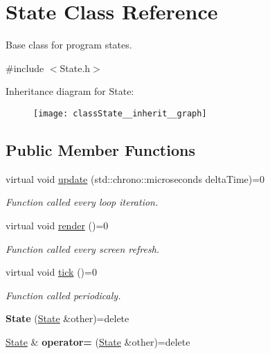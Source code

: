 \hypertarget{classState}{\section{State Class Reference}
\label{classState}
}


Base class for program states.  




{\ttfamily \#include $<$State.\-h$>$}



Inheritance diagram for State\-:
\nopagebreak
\begin{figure}[H]
\begin{center}
\leavevmode
\texttt{[image: classState\_\_inherit\_\_graph]}
\end{center}
\end{figure}
\subsection*{Public Member Functions}
\begin{DoxyCompactItemize}
\item 
virtual void \hyperlink{classState_af2121f8eb52144b7a789214f15e3601a}{update} (std\-::chrono\-::microseconds delta\-Time)=0
\begin{DoxyCompactList}\small\item\em Function called every loop iteration. \end{DoxyCompactList}\item 
virtual void \hyperlink{classState_a71f5105bcdc39481be7684d853fe12e9}{render} ()=0
\begin{DoxyCompactList}\small\item\em Function called every screen refresh. \end{DoxyCompactList}\item 
virtual void \hyperlink{classState_a1cdec36e9ffad91ba7af560770601017}{tick} ()=0
\begin{DoxyCompactList}\small\item\em Function called periodicaly. \end{DoxyCompactList}\item 
\hypertarget{classState_a8fba10b9995ce898339f3b0d39234788}{{\bfseries State} (\hyperlink{classState}{State} \&other)=delete}\label{classState_a8fba10b9995ce898339f3b0d39234788}

\item 
\hypertarget{classState_a7ac6cc4de6723746df3dfb183b8eb84f}{\hyperlink{classState}{State} \& {\bfseries operator=} (\hyperlink{classState}{State} \&other)=delete}\label{classState_a7ac6cc4de6723746df3dfb183b8eb84f}

\end{DoxyCompactItemize}


